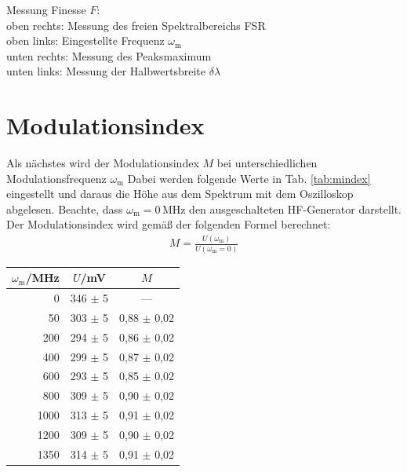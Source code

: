 \begin{center}
\begin{tabular}{c c}
    \end{tabular}
    \caption{Messung Finesse $F$:\\
    oben rechts: Messung des freien Spektralbereichs FSR\\
    oben links: Eingestellte Frequenz  $\omega_\mathrm{m}$\\
    unten rechts: Messung des Peaksmaximum\\
    unten links: Messung der Halbwertsbreite $\delta \lambda$}
    \label{fig:finess}
\end{center}

\newpage
\section{Modulationsindex}
\label{sec:mindex}

Als nächstes wird der Modulationsindex $M$ bei unterschiedlichen Modulationsfrequenz $\omega_\mathrm{m}$ Dabei werden folgende Werte in Tab. \ref{tab:mindex} eingestellt und daraus die Höhe aus dem Spektrum mit dem Oszilloskop abgelesen. Beachte, dass $\omega_\mathrm{m} = 0$\,MHz den ausgeschalteten HF-Generator darstellt. Der Modulationsindex wird gemäß der folgenden Formel berechnet:
\begin{gather}
    M = \frac{U(\omega_\mathrm{m})}{U(\omega_\mathrm{m} = 0)}
\end{gather}
\begin{center}
    \captionsetup{type=table}
    \begin{tabular}{r | c c}
        $\omega_\mathrm{m}$/MHz & $U$/mV & $M$ \\ \hline
        0    & 346 $\pm$ 5 & --- \\
        50   & 303 $\pm$ 5 & 0,88 $\pm$ 0,02 \\
        200  & 294 $\pm$ 5 & 0,86 $\pm$ 0,02 \\
        400  & 299 $\pm$ 5 & 0,87 $\pm$ 0,02 \\
        600  & 293 $\pm$ 5 & 0,85 $\pm$ 0,02 \\
        800  & 309 $\pm$ 5 & 0,90 $\pm$ 0,02 \\
        1000 & 313 $\pm$ 5 & 0,91 $\pm$ 0,02 \\
        1200 & 309 $\pm$ 5 & 0,90 $\pm$ 0,02 \\
        1350 & 314 $\pm$ 5 & 0,91 $\pm$ 0,02 \\
    \end{tabular}
    \label{tab:mindex}
\end{center}

